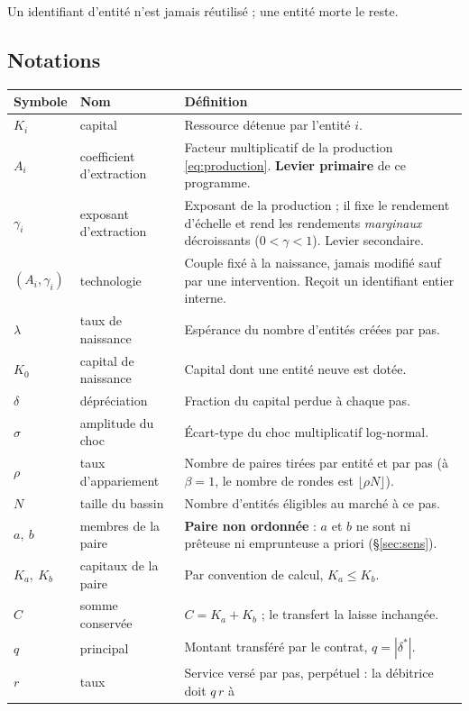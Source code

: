 Un identifiant d'entité n'est jamais réutilisé ; une entité morte le reste.

\subsection{Notations}

\begin{center}\footnotesize
\begin{tabular}{@{}llp{8.4cm}@{}}
\toprule
\textbf{Symbole} & \textbf{Nom} & \textbf{Définition} \\
\midrule
$K_i$ & capital & Ressource détenue par l'entité $i$. \\
$A_i$ & coefficient d'extraction & Facteur multiplicatif de la production
\eqref{eq:production}. \textbf{Levier primaire} de ce programme. \\
$\gamma_i$ & exposant d'extraction & Exposant de la production ; il fixe le
rendement d'échelle et rend les rendements \emph{marginaux} décroissants
($0<\gamma<1$). Levier secondaire. \\
$(A_i,\gamma_i)$ & technologie & Couple fixé à la naissance, jamais modifié
sauf par une intervention. Reçoit un identifiant entier interne. \\
$\lambda$ & taux de naissance & Espérance du nombre d'entités créées par pas. \\
$K_0$ & capital de naissance & Capital dont une entité neuve est dotée. \\
$\delta$ & dépréciation & Fraction du capital perdue à chaque pas. \\
$\sigma$ & amplitude du choc & Écart-type du choc multiplicatif log-normal. \\
$\rho$ & taux d'appariement & Nombre de paires tirées par entité et par pas
(à $\beta = 1$, le nombre de rondes est $\lfloor \rho N \rfloor$). \\
$N$ & taille du bassin & Nombre d'entités éligibles au marché à ce pas. \\
$a,\ b$ & membres de la paire & \textbf{Paire non ordonnée} : $a$ et $b$ ne
sont ni prêteuse ni emprunteuse a priori (§\ref{sec:sens}). \\
$K_a,\ K_b$ & capitaux de la paire & Par convention de calcul, $K_a \le K_b$. \\
$C$ & somme conservée & $C = K_a+K_b$ ; le transfert la laisse inchangée. \\
$q$ & principal & Montant transféré par le contrat, $q = |\delta^{*}|$. \\
$r$ & taux & Service versé par pas, perpétuel : la débitrice doit $q\,r$ à

\end{tabular}
\end{center}
